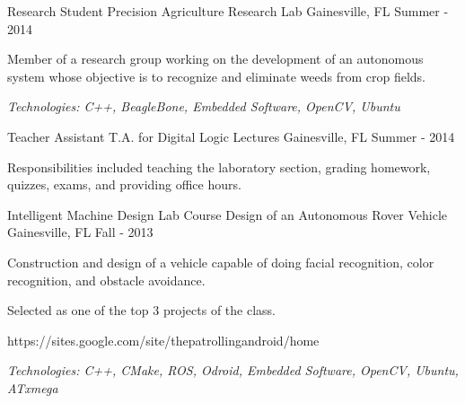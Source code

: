\begin{cventries}
	\cventry
		{Research Student} %
		{Precision Agriculture Research Lab} %
		{Gainesville, FL} %
		{Summer - 2014} %
		{
			\begin{cvitems} %
			\item {Member of a research group working on the development of an autonomous system whose objective is to recognize and eliminate weeds from crop fields.}
			\item {\it{Technologies:} C++, BeagleBone, Embedded Software, OpenCV, Ubuntu}
			\end{cvitems}
		}

	\cventry
		{Teacher Assistant} %
		{T.A. for Digital Logic Lectures} %
		{Gainesville, FL} %
		{Summer - 2014} %
		{
			\begin{cvitems} %
			\item {Responsibilities included teaching the laboratory section, grading homework, quizzes, exams, and providing office hours.}
			\end{cvitems}
		}

	\cventry
		{Intelligent Machine Design Lab Course} %
		{Design of an Autonomous Rover Vehicle} %
		{Gainesville, FL} %
		{Fall - 2013} %
		{
			\begin{cvitems} %
				\item {Construction and design of a vehicle capable of doing facial recognition, color recognition, and
					obstacle avoidance.}
        \item {Selected as one of the top 3 projects of the class.}
        \item {https://sites.google.com/site/thepatrollingandroid/home}
				\item {\it{Technologies:} C++, CMake, ROS, Odroid, Embedded Software, OpenCV, Ubuntu, ATxmega}
			\end{cvitems}
		}

\end{cventries}
